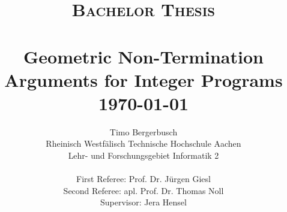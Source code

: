 
\title{ \normalsize \textsc{Bachelor Thesis}
	\\ [2.0cm]
	\HRule{0.5pt} \\
	\LARGE \textbf{Geometric Non-Termination Arguments for Integer Programs}
	\HRule{2pt} \\ [0.5cm]
	\normalsize \coverFormat\today \vspace*{5\baselineskip}}

\date{}

\author{
	Timo Bergerbusch\\ 
	Rheinisch Westfälisch Technische Hochschule Aachen \\
	Lehr- und Forschungsgebiet Informatik 2  \\ \\
	First Referee: Prof. Dr. Jürgen Giesl \\
	Second Referee: apl. Prof. Dr. Thomas Noll \\
	Supervisor: Jera Hensel
	}

\maketitle
